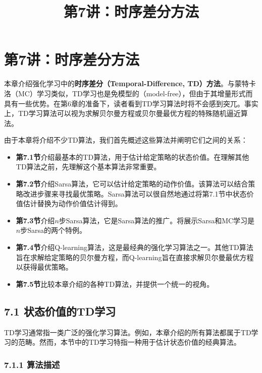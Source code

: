 \documentclass[UTF8]{article}
\title{第7讲：时序差分方法}
\author{}
\date{}
\begin{document}
\maketitle
\thispagestyle{empty}

\section*{第7讲：时序差分方法}

本章介绍强化学习中的\textbf{时序差分（Temporal-Difference, TD）方法}。与蒙特卡洛（MC）学习类似，TD学习也是免模型的（model-free），但由于其增量形式而具有一些优势。在第6章的准备下，读者看到TD学习算法时将不会感到突兀。事实上，TD学习算法可以视为求解贝尔曼方程或贝尔曼最优方程的特殊随机逼近算法。

由于本章将介绍不少TD算法，我们首先概述这些算法并阐明它们之间的关系：
\begin{itemize}
    \item \textbf{第7.1节}介绍最基本的TD算法，用于估计给定策略的状态价值。在理解其他TD算法之前，先理解这个基本算法非常重要。
    \item \textbf{第7.2节}介绍Sarsa算法，它可以估计给定策略的动作价值。该算法可以结合策略改进步骤来寻找最优策略。Sarsa算法可以很自然地通过将第7.1节中状态价值估计替换为动作价值估计得到。
    \item \textbf{第7.3节}介绍$n$步Sarsa算法，它是Sarsa算法的推广。将展示Sarsa和MC学习是$n$步Sarsa的两个特例。
    \item \textbf{第7.4节}介绍Q-learning算法，这是最经典的强化学习算法之一。其他TD算法旨在求解给定策略的贝尔曼方程，而Q-learning旨在直接求解贝尔曼最优方程以获得最优策略。
    \item \textbf{第7.5节}比较本章介绍的各种TD算法，并提供一个统一的视角。
\end{itemize}

\subsection*{7.1 状态价值的TD学习}

TD学习通常指一类广泛的强化学习算法。例如，本章介绍的所有算法都属于TD学习的范畴。然而，本节中的TD学习特指一种用于估计状态价值的经典算法。

\subsubsection*{7.1.1 算法描述}
\end{document}

